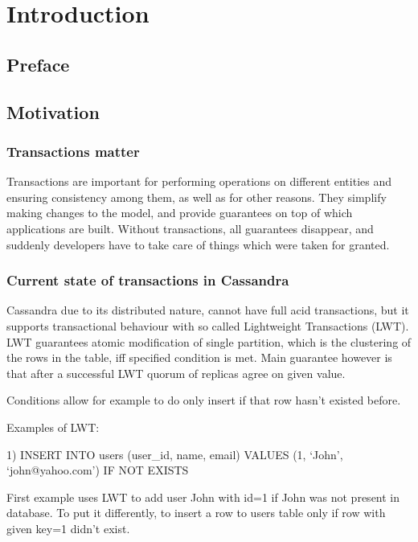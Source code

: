 
\chapter{Introduction}\label{chapter:introduction}

\section{Preface}\label{sec:introduction:preface}

\section{Motivation}\label{sec:introduction:motivation}

\subsection{Transactions matter}
Transactions are important for performing operations on different entities and ensuring consistency among them, as well as for other reasons. They simplify making changes to the model, and provide guarantees on top of which applications are built. Without transactions, all guarantees disappear, and suddenly developers have to take care of things which were taken for granted.

\subsection{Current state of transactions in Cassandra}	
Cassandra due to its distributed nature, cannot have full acid transactions, but it supports transactional behaviour with so called Lightweight Transactions (LWT).
LWT guarantees atomic modification of single partition, which is the clustering of the rows in the table, iff specified condition is met. Main guarantee however is that after a successful LWT quorum of replicas agree on given value.

Conditions allow for example to do only insert if that row hasn’t existed before. 

Examples of LWT:

1)
INSERT INTO users (user_id, name, email)  VALUES (1, ‘John’, ‘john@yahoo.com’) IF NOT EXISTS

First example uses LWT to add user John with id=1 if John was not present in database. To put it differently, to insert a row to users table only if row with given key=1 didn’t exist.

